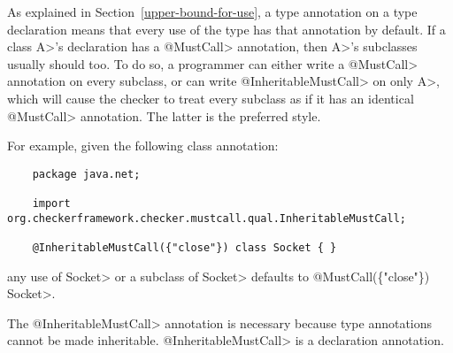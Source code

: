 
As explained in Section~\ref{upper-bound-for-use}, a type
annotation on a type declaration means that every use of the type has that
annotation by default.  If a class \<A>'s declaration has a \<@MustCall>
annotation, then \<A>'s subclasses usually should too.  To do so, a programmer can either write
a \<@MustCall> annotation on every subclass, or can write \<@InheritableMustCall>
on only \<A>, which will cause the checker to treat every subclass as if
it has an identical \<@MustCall> annotation.  The latter is the preferred style.

For example, given the following class annotation:
\begin{Verbatim}
    package java.net;

    import org.checkerframework.checker.mustcall.qual.InheritableMustCall;

    @InheritableMustCall({"close"}) class Socket { }
\end{Verbatim}
any use of \<Socket> or a subclass of \<Socket> defaults to \<@MustCall(\{"close"\}) Socket>.

The \<@InheritableMustCall> annotation is necessary because type
annotations cannot be made inheritable.  \<@InheritableMustCall> is
a declaration annotation.





